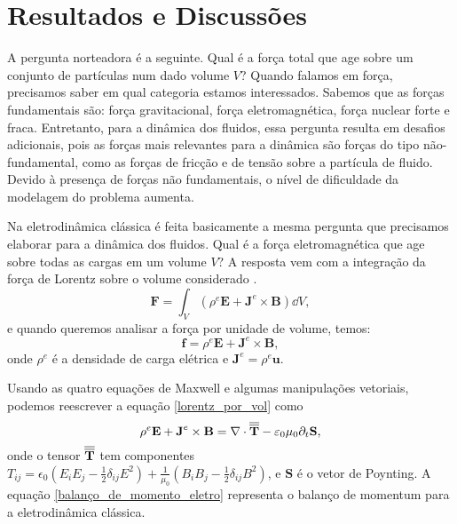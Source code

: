 \chapter[Resultados e Discussões]{Resultados e Discussões}
\label{Resultados e Discussões}
A pergunta norteadora é a seguinte. Qual é a força total que age sobre um conjunto de partículas num dado volume $V$? Quando falamos em força, precisamos saber em qual categoria estamos interessados. Sabemos que as forças fundamentais são: força gravitacional, força eletromagnética, força nuclear forte e fraca. Entretanto, para a dinâmica dos fluidos, essa pergunta resulta em desafios adicionais, pois as forças mais relevantes para a dinâmica são forças do tipo não-fundamental, como as forças de fricção e de tensão sobre a partícula de fluido. Devido à presença de forças não fundamentais, o nível de dificuldade da modelagem do problema aumenta.

Na eletrodinâmica clássica é feita basicamente a mesma pergunta que precisamos elaborar para a dinâmica dos fluidos. Qual é a força eletromagnética que age sobre todas as cargas em um volume $V$? A resposta vem com a integração da força de Lorentz sobre o volume considerado \cite{griffiths2005introduction, jackson1999classical}.
\begin{equation}\label{Lorentz_int}
    \textbf{F} = \int_{V}(\rho^{e} \textbf{E} + \textbf{J}^{e} \times \textbf{B}) \dd V,
\end{equation}
e quando queremos analisar a força por unidade de volume, temos:
\begin{equation}\label{lorentz_por_vol}
    \textbf{f} = \rho^{e} \textbf{E} + \textbf{J}^{e} \times \textbf{B},
\end{equation}
onde $\rho^{e}$ é a densidade de carga elétrica e $\textbf{J}^{e} =\rho^{e}\textbf{u}$.

Usando as quatro equações de Maxwell e algumas manipulações vetoriais, podemos reescrever a equação \ref{lorentz_por_vol} como \cite{jackson1999classical, griffiths2005introduction} 
\begin{equation}\label{balanço_de_momento_eletro}
    \rho^{e} \textbf{E} + \textbf{J}^{e} \times \textbf{B} = \nabla \cdot \overline{\overline{\textbf{T}}} -\varepsilon_{0}\mu_{0}\partial_{t}\textbf{S},
\end{equation}
onde o tensor $\overline{\overline{\textbf{T}}}$ tem componentes $T_{ij} = \epsilon_{0}\left(E_{i}E_{j} - \frac{1}{2}\delta_{ij}E^{2}\right) + \frac{1}{\mu_{0}}\left(B_{i}B_{j} - \frac{1}{2}\delta_{ij}B^{2}\right)$, e $\textbf{S}$ é o vetor de Poynting. A equação \ref{balanço_de_momento_eletro} representa o balanço de momentum para a eletrodinâmica clássica.

